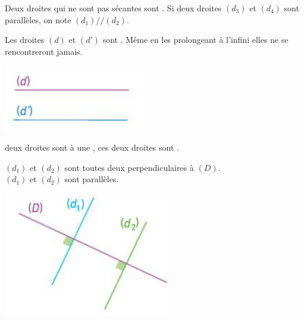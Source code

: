 \begin{mydef}
	Deux droites qui ne sont pas sécantes sont \hspace*{6cm}. Si deux droites $(d_3)$ et $(d_4)$ sont parallèles, on note $(d_1) // (d_2)$.
\end{mydef}

\begin{myex}
	\begin{multicols}{2}
		Les droites $(d)$ et $(d')$ sont \hspace*{5cm}. Même en les prolongeant à l'infini elles ne se rencontreront jamais.
		
		\includegraphics[scale=0.6]{img/para1}
	\end{multicols}
	
\end{myex}

\begin{myprop}
	 deux droites sont \hspace*{6cm} à une \hspace*{8cm},  ces deux droites sont \hspace*{6cm}.
\end{myprop}


\begin{myex}
	\begin{multicols}{2}
		 $(d_1)$ et $(d_2)$ sont toutes deux perpendiculaires à $(D)$.\\
		 $(d_1)$ et $(d_2)$ sont parallèles.
		
		\includegraphics[scale=0.6]{img/para2}
	\end{multicols}
	
\end{myex}